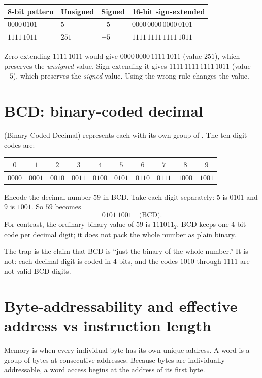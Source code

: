 \begin{center}
\begin{tabular}{llll}
\toprule
\textbf{8-bit pattern} & \textbf{Unsigned} & \textbf{Signed} & \textbf{16-bit sign-extended} \\
\midrule
$0000\,0101$ & $5$ & $+5$ & $0000\,0000\,0000\,0101$ \\
$1111\,1011$ & $251$ & $-5$ & $1111\,1111\,1111\,1011$ \\
\bottomrule
\end{tabular}
\end{center}

Zero-extending $1111\,1011$ would give $0000\,0000\,1111\,1011$ (value $251$),
which preserves the \emph{unsigned} value. Sign-extending it gives
$1111\,1111\,1111\,1011$ (value $-5$), which preserves the \emph{signed}
value. Using the wrong rule changes the value.

\section{BCD: binary-coded decimal}
 (Binary-Coded Decimal) represents each  with its
own group of . The ten digit codes are:

\begin{center}
\begin{tabular}{cccccccccc}
\toprule
$0$ & $1$ & $2$ & $3$ & $4$ & $5$ & $6$ & $7$ & $8$ & $9$ \\
\midrule
$0000$ & $0001$ & $0010$ & $0011$ & $0100$ & $0101$ & $0110$ & $0111$ & $1000$ & $1001$ \\
\bottomrule
\end{tabular}
\end{center}

\begin{example}
Encode the decimal number $59$ in BCD. Take each digit separately: $5$ is
$0101$ and $9$ is $1001$. So $59$ becomes
\[
0101\ 1001 \quad\text{(BCD)}.
\]
For contrast, the ordinary binary value of $59$ is $111011_2$. BCD keeps one
4-bit code per decimal digit; it does not pack the whole number as plain
binary.
\end{example}

The trap is the claim that BCD is ``just the binary of the whole number.''
It is not: each decimal digit is coded in 4 bits, and the codes $1010$ through
$1111$ are not valid BCD digits.

\section{Byte-addressability and effective address vs instruction length}
Memory is  when every individual byte has its own unique
address. A word is a group of bytes at consecutive addresses. Because bytes
are individually addressable, a word access begins at the address of its
first byte.

